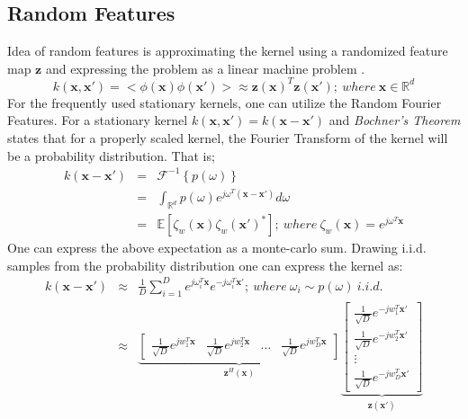 \documentclass{article}
\begin{document}
\subsection{Random Features}
Idea of random features is approximating the kernel using a randomized feature map $\mathbf{z}$ and expressing the problem as a linear machine problem \cite{randomfeatures}. 
\begin{equation}
k(\mathbf{x},\mathbf{x'})=<\phi(\mathbf{x})\phi(\mathbf{x'})>\approx \mathbf{z}(\mathbf{x})^T\mathbf{z}(\mathbf{x'}); \>where\> \mathbf{x} \in \mathbb{R}^d
\end{equation}
For the frequently used stationary kernels, one can utilize the Random Fourier Features. For a stationary kernel $k(\mathbf{x},\mathbf{x'})=k(\mathbf{x}-\mathbf{x'})$ and \textit{Bochner's Theorem} states that for a properly scaled kernel, the Fourier Transform of the kernel will be a probability distribution. That is; 
\begin{eqnarray}
k(\mathbf{x}-\mathbf{x'})&=&\mathcal{F}^{-1}\left\{p(\omega)\right\} \nonumber \\
&=&\int_{\mathbb{R}^d}p(\omega)e^{j\omega^T(\mathbf{x}-\mathbf{x'})}d\omega \nonumber \\
&=&\mathbb{E}[\zeta_w(\mathbf{x})\zeta_w(\mathbf{x'})^*]; \>where \> \zeta_w(\mathbf{x})=e^{j\omega^T\mathbf{x}}
\end{eqnarray}
One can express the above expectation as a monte-carlo sum. Drawing i.i.d. samples from the probability distribution one can express the kernel as:
\begin{eqnarray}
k(\mathbf{x}-\mathbf{x'})&\approx& \frac{1}{D}\sum_{i=1}^De^{j\omega_i^T\mathbf{x}}e^{-j\omega_i^T\mathbf{x'}}; \> where \> \omega_i\sim p(\omega) \> i.i.d. \nonumber \\
&\approx& \underbrace{\begin{bmatrix}
\frac{1}{\sqrt{D}} e^{jw_1^T\mathbf{x}}& \frac{1}{\sqrt{D}} e^{jw_2^T\mathbf{x}}
& \dots
& \frac{1}{\sqrt{D}} e^{jw_D^T\mathbf{x}}
\end{bmatrix} }_{\mathbf{z}^H(\mathbf{x})}
\underbrace{\begin{bmatrix}
\frac{1}{\sqrt{D}} e^{-jw_1^T\mathbf{x'}}\\ \frac{1}{\sqrt{D}} e^{-jw_2^T\mathbf{x'}}
\\ \vdots
\\ \frac{1}{\sqrt{D}} e^{-jw_D^T\mathbf{x'}}
\end{bmatrix}}_{\mathbf{z}(\mathbf{x'})}
\end{eqnarray}
\end{document}
